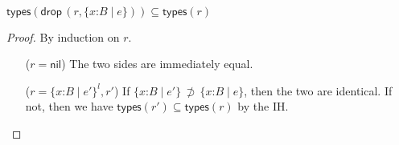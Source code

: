 \documentclass[9pt]{extarticle}
\newcommand{\ottnt}[1]{\mathit{#1}}
\newcommand{\ottsym}[1]{#1}
\begin{document}
\begin{lemma}
  \label{lem:typesdrop}
  ~

  \noindent
  $  \mathsf{types} ( \mathsf{drop} \, \ottsym{(}  \ottnt{r}  \ottsym{,}   \{ \mathit{x} \mathord{:} \ottnt{B} \mathrel{\mid} \ottnt{e} \}   \ottsym{)} )   \subseteq   \mathsf{types} ( \ottnt{r} )  $
\begin{proof}
    By induction on $\ottnt{r}$.
\begin{itemize}
      \item[($\ottnt{r}  \ottsym{=}  \mathsf{nil}$)] The two sides are immediately equal.
      \item[($\ottnt{r}  \ottsym{=}    \{ \mathit{x} \mathord{:} \ottnt{B} \mathrel{\mid} \ottnt{e'} \}^{ \ottnt{l} }  , \ottnt{r'} $)] If $ \{ \mathit{x} \mathord{:} \ottnt{B} \mathrel{\mid} \ottnt{e'} \}  \, \not \supset \,  \{ \mathit{x} \mathord{:} \ottnt{B} \mathrel{\mid} \ottnt{e} \} $, then the
        two are identical. If not, then we have $  \mathsf{types} ( \ottnt{r'} )   \subseteq   \mathsf{types} ( \ottnt{r} )  $ by the IH.
    \end{itemize}
  \end{proof}
\end{lemma}
\end{document}
